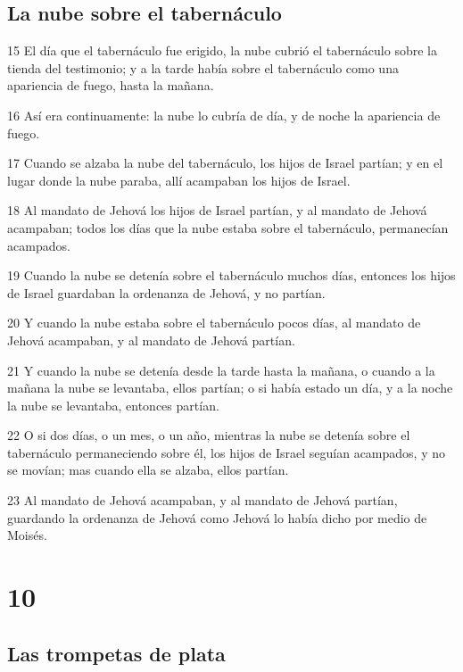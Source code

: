 \section*{La nube sobre el tabernáculo }

\par 15 El día que el tabernáculo fue erigido, la nube cubrió el tabernáculo sobre la tienda del testimonio; y a la tarde había sobre el tabernáculo como una apariencia de fuego, hasta la mañana.
\par 16 Así era continuamente: la nube lo cubría de día, y de noche la apariencia de fuego.
\par 17 Cuando se alzaba la nube del tabernáculo, los hijos de Israel partían; y en el lugar donde la nube paraba, allí acampaban los hijos de Israel.
\par 18 Al mandato de Jehová los hijos de Israel partían, y al mandato de Jehová acampaban; todos los días que la nube estaba sobre el tabernáculo, permanecían acampados.
\par 19 Cuando la nube se detenía sobre el tabernáculo muchos días, entonces los hijos de Israel guardaban la ordenanza de Jehová, y no partían.
\par 20 Y cuando la nube estaba sobre el tabernáculo pocos días, al mandato de Jehová acampaban, y al mandato de Jehová partían.
\par 21 Y cuando la nube se detenía desde la tarde hasta la mañana, o cuando a la mañana la nube se levantaba, ellos partían; o si había estado un día, y a la noche la nube se levantaba, entonces partían.
\par 22 O si dos días, o un mes, o un año, mientras la nube se detenía sobre el tabernáculo permaneciendo sobre él, los hijos de Israel seguían acampados, y no se movían; mas cuando ella se alzaba, ellos partían.
\par 23 Al mandato de Jehová acampaban, y al mandato de Jehová partían, guardando la ordenanza de Jehová como Jehová lo había dicho por medio de Moisés.

\chapter{10}

\section*{Las trompetas de plata }

